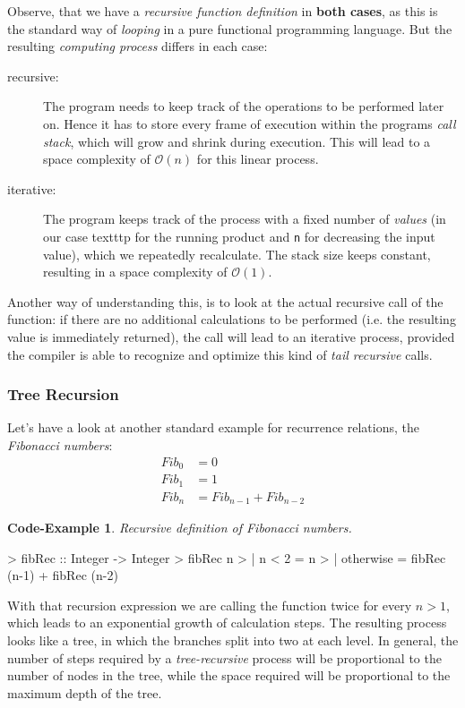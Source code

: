 \documentclass{scrartcl}
\newtheorem{impl}[defn]{Code-Example}
\numberwithin{equation}{section}
\begin{document}
Observe, that we have a \emph{recursive function definition} in \textbf{both cases}, as this is the standard way of \emph{looping} in a pure functional programming language.
But the resulting \emph{computing process} differs in each case:
\begin{description}
\item[recursive:]
The program needs to keep track of the operations to be performed later on. Hence it has to store every frame of execution within the programs \emph{call stack}, which will grow and shrink during execution. This will lead to a space complexity of $\mathcal{O}(n)$ for this linear process.
\item[iterative:]
The program keeps track of the process with a fixed number of \emph{values} (in our case texttt{p} for the running product and \texttt{n} for decreasing the input value), which we repeatedly recalculate. The stack size keeps constant, resulting in a space complexity of $\mathcal{O}(1)$.
\end{description}
Another way of understanding this, is to look at the actual recursive call of the function:
if there are no additional calculations to be performed (i.e. the resulting value is immediately returned), the call will lead to an iterative process, provided the compiler is able to recognize and optimize this kind of \emph{tail recursive} calls.

\subsubsection{Tree Recursion}

Let's have a look at another standard example for recurrence relations, the \emph{Fibonacci numbers}:
\begin{align*}
    Fib_0 &= 0 \\ Fib_1 &= 1 \\ Fib_n &= Fib_{n-1} + Fib_{n-2}
\end{align*}

\begin{impl}
Recursive definition of Fibonacci numbers.
\end{impl}

\begin{haskellcode}

> fibRec :: Integer -> Integer
> fibRec n
>   | n < 2 = n
>   | otherwise = fibRec (n-1) + fibRec (n-2)

\end{haskellcode}

With that recursion expression we are calling the function twice for every $n>1$, which leads to an exponential growth of calculation steps.
The resulting process looks like a tree, in which the branches split into two at each level.
In general, the number of steps required by a \emph{tree-recursive} process will be proportional to the number of nodes in the tree, while the space required will be proportional to the maximum depth of the tree.
\end{document}

